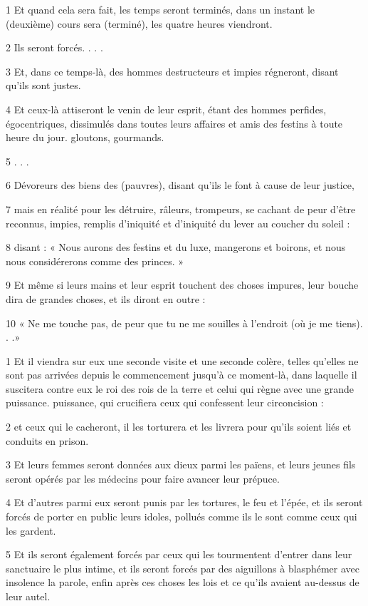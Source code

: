 \par 1 Et quand cela sera fait, les temps seront terminés, dans un instant le (deuxième) cours sera (terminé), les quatre heures viendront.
\par 2 Ils seront forcés. . . .
\par 3 Et, dans ce temps-là, des hommes destructeurs et impies régneront, disant qu'ils sont justes.
\par 4 Et ceux-là attiseront le venin de leur esprit, étant des hommes perfides, égocentriques, dissimulés dans toutes leurs affaires et amis des festins à toute heure du jour. gloutons, gourmands.
\par 5 . . .
\par 6 Dévoreurs des biens des (pauvres), disant qu'ils le font à cause de leur justice,
\par 7 mais en réalité pour les détruire, râleurs, trompeurs, se cachant de peur d'être reconnus, impies, remplis d'iniquité et d'iniquité du lever au coucher du soleil :
\par 8 disant : « Nous aurons des festins et du luxe, mangerons et boirons, et nous nous considérerons comme des princes. »
\par 9 Et même si leurs mains et leur esprit touchent des choses impures, leur bouche dira de grandes choses, et ils diront en outre :
\par 10 « Ne me touche pas, de peur que tu ne me souilles à l'endroit (où je me tiens). . .»


\par 1 Et il viendra sur eux une seconde visite et une seconde colère, telles qu'elles ne sont pas arrivées depuis le commencement jusqu'à ce moment-là, dans laquelle il suscitera contre eux le roi des rois de la terre et celui qui règne avec une grande puissance. puissance, qui crucifiera ceux qui confessent leur circoncision :
\par 2 et ceux qui le cacheront, il les torturera et les livrera pour qu'ils soient liés et conduits en prison.
\par 3 Et leurs femmes seront données aux dieux parmi les païens, et leurs jeunes fils seront opérés par les médecins pour faire avancer leur prépuce.
\par 4 Et d'autres parmi eux seront punis par les tortures, le feu et l'épée, et ils seront forcés de porter en public leurs idoles, pollués comme ils le sont comme ceux qui les gardent.
\par 5 Et ils seront également forcés par ceux qui les tourmentent d'entrer dans leur sanctuaire le plus intime, et ils seront forcés par des aiguillons à blasphémer avec insolence la parole, enfin après ces choses les lois et ce qu'ils avaient au-dessus de leur autel.

